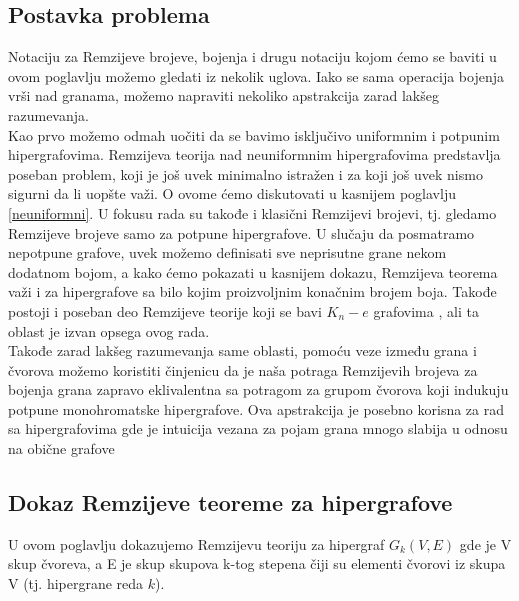 \documentclass[a4paper]{article}
\begin{document}
	\subsection{Postavka problema}\label{psotavka}
	Notaciju za Remzijeve brojeve, bojenja i drugu notaciju kojom ćemo se baviti u ovom poglavlju možemo gledati iz nekolik uglova. Iako se sama operacija bojenja vrši nad granama, možemo napraviti nekoliko apstrakcija zarad lakšeg razumevanja.\\
	Kao prvo možemo odmah uočiti da se bavimo isključivo uniformnim i potpunim hipergrafovima. Remzijeva teorija nad neuniformnim hipergrafovima predstavlja poseban problem, koji je još uvek minimalno istražen i za koji još uvek nismo sigurni da li uopšte važi. O ovome ćemo diskutovati u kasnijem poglavlju \ref{neuniformni}. U fokusu rada su takođe i klasični Remzijevi brojevi, tj. gledamo Remzijeve brojeve samo za potpune hipergrafove. U slučaju da posmatramo nepotpune grafove, uvek možemo definisati sve neprisutne grane nekom dodatnom bojom, a kako ćemo pokazati u kasnijem dokazu, Remzijeva teorema važi i za hipergrafove sa bilo kojim proizvoljnim konačnim brojem boja. Takođe postoji i poseban deo Remzijeve teorije koji se bavi $K_n - e$ grafovima \cite{pregled}, ali ta oblast je izvan opsega ovog rada.\\
	Takođe zarad lakšeg razumevanja same oblasti, pomoću veze između grana i čvorova možemo koristiti činjenicu da je naša potraga Remzijevih brojeva za bojenja grana zapravo eklivalentna sa potragom za grupom čvorova koji indukuju potpune monohromatske hipergrafove. Ova apstrakcija je posebno korisna za rad sa hipergrafovima gde je intuicija vezana za pojam grana mnogo slabija u odnosu na obične grafove
	\subsection{Dokaz Remzijeve teoreme za hipergrafove}
	U ovom poglavlju dokazujemo Remzijevu teoriju %
	za hipergraf $ G_{k}(V, E)$ gde je V skup čvoreva, a E je skup skupova k-tog stepena čiji su elementi čvorovi iz skupa V (tj. hipergrane reda $k$).
	
\end{document}
